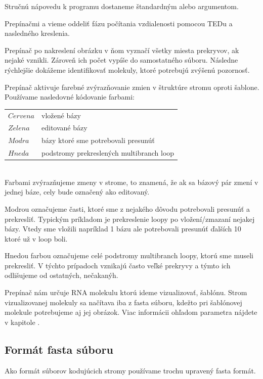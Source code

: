 Stručnú nápovedu k programu dostaneme štandardným  alebo  argumentom.

Prepínačmi  a  vieme oddeliť fázu počítania vzdialenosti pomocou TEDu a nasledného kreslenia.

Prepínač  po nakreslení obrázku v ňom vyznačí všetky miesta prekryvov, ak nejaké vznikli.
Zároveň ich počet vypíše do samostatného súboru. Následne rýchlejšie dokážeme identifikovať molekuly, ktoré
potrebujú zvýšenú pozornosť.

Prepínač  aktivuje farebné zvýrazňovanie zmien v štruktúre stromu oproti šablone.
Používame nasledovné kódovanie farbami:

\begin{tabular}{@{$\bullet$ }ll}
  $Cervena$ & vložené bázy
  \\
  $Zelena$  & editované bázy
  \\
  $Modra$   & bázy ktoré sme potrebovali presunúť
  \\
  $Hneda$   & podstromy prekreslených multibranch loop
\end{tabular}
\\

Farbami zvýrazňujeme zmeny v strome, to znamená, že ak sa bázový pár zmení v jednej báze,
cely bude označený ako editovaný.

Modrou označujeme časti, ktoré sme z nejakého dôvodu potrebovali presunúť a prekresliť. Typickým príkladom
je prekreslenie loopy po vložení/zmazaní nejakej bázy. Vtedy sme vložili napríklad 1 bázu ale potrebovali
presunúť ďalších 10 ktoré už v loop boli.

Hnedou farbou označujeme celé podstromy multibranch loopy, ktorú sme museli prekresliť.
V týchto prípadoch vznikajú často veľké prekryvy a týmto ich odlišujeme od ostatných, nečakanýh.

Prepínač  nám určuje RNA molekulu ktorú ideme vizualizovať, 
šablónu. Strom vizualizovanej molekuly sa načítava iba z fasta súboru, kdežto pri šablónovej molekule
potrebujeme aj jej obrázok. Viac informácii ohľadom parametra  nájdete v kapitole .

\subsection{Formát fasta súboru}

Ako formát súborov kodujúcich stromy používame trochu upravený fasta formát.

